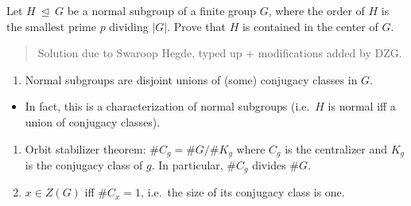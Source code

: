 Let \(H {~\trianglelefteq~}G\) be a normal subgroup of a finite group
\(G\), where the order of \(H\) is the smallest prime \(p\) dividing
\({\left\lvert {G} \right\rvert}\). Prove that \(H\) is contained in the
center of \(G\).

\begin{quote}
Solution due to Swaroop Hegde, typed up + modifications added by DZG.
\end{quote}

\begin{concept}

\envlist

\begin{enumerate}
\def\labelenumi{\arabic{enumi}.}
\tightlist
\item
  Normal subgroups are disjoint unions of (some) conjugacy classes in
  \(G\).
\end{enumerate}

\begin{itemize}
\tightlist
\item
  In fact, this is a characterization of normal subgroups (i.e.~\(H\) is
  normal iff a union of conjugacy classes).
\end{itemize}

\begin{enumerate}
\def\labelenumi{\arabic{enumi}.}
\setcounter{enumi}{1}
\tightlist
\item
  Orbit stabilizer theorem: \(\# C_g = \# G/ \# K_g\) where \(C_g\) is
  the centralizer and \(K_g\) is the conjugacy class of \(g\). In
  particular, \(\# C_g\) divides \(\#G\).
\item
  \(x\in Z(G)\) iff \(\# C_x = 1\), i.e.~the size of its conjugacy class
  is one.
\end{enumerate}

\end{concept}

